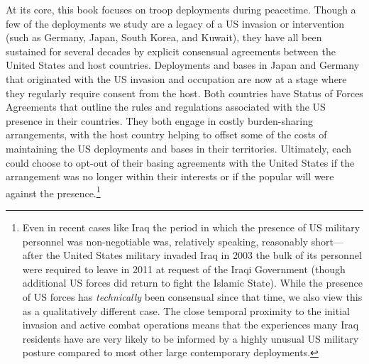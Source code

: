 At its core, this book focuses on troop deployments during peacetime. Though a few of the deployments we study are a legacy of a US invasion or intervention (such as Germany, Japan, South Korea, and Kuwait), they have all been sustained for several decades by explicit consensual agreements between the United States and host countries. Deployments and bases in Japan  and Germany  that originated with the US invasion and occupation are now at a stage where they regularly require consent from the host. Both countries have Status of Forces Agreements that outline the rules and regulations associated with the US presence in their countries. They both engage in costly burden-sharing arrangements, with the host country helping to offset some of the costs of maintaining the US deployments and bases in their territories. Ultimately, each could choose to opt-out of their basing agreements with the United States if the arrangement was no longer within their interests or if the popular will were against the presence.\footnote{Even in recent cases like Iraq the period in which the presence of US military personnel was non-negotiable was, relatively speaking, reasonably short---after the United States military invaded Iraq in 2003 the bulk of its personnel were required to leave in 2011 at request of the Iraqi Government (though additional US forces did return to fight the Islamic State). While the presence of US forces has \textit{technically} been consensual since that time, we also view this as a qualitatively different case. The close temporal proximity to the initial invasion and active combat operations means that the experiences many Iraq residents have are very likely to be informed by a highly unusual US military posture compared to most other large contemporary deployments.}


